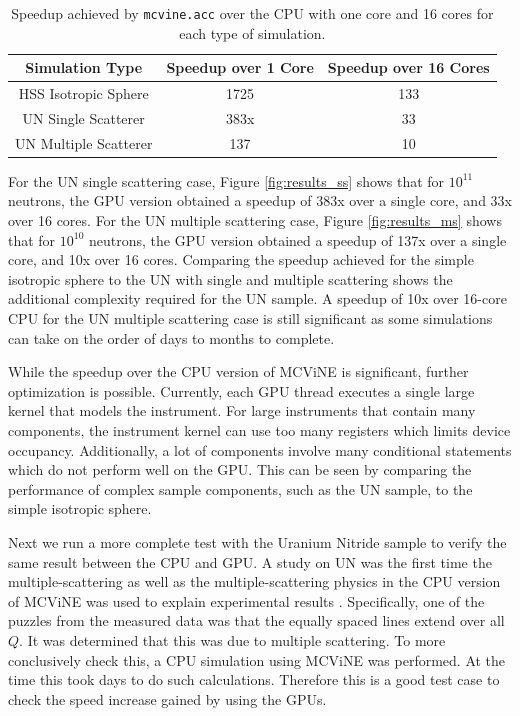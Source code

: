 \begin{table}[h]
    \centering
    \begin{tabular}{c|c|c}
        Simulation Type & Speedup over 1 Core & Speedup over 16 Cores \\
        \hline
        HSS Isotropic Sphere & 1725 & 133 \\
        UN Single Scatterer & 383x & 33 \\
        UN Multiple Scatterer & 137 & 10 \\
        \hline
    \end{tabular}
    \caption{Speedup achieved by \texttt{mcvine.acc} over the CPU with one core and 16 cores for each type of simulation.}
    \label{tab:speedup}
\end{table}


For the UN single scattering case, Figure \ref{fig:results_ss} shows that for $10^{11}$ neutrons, the GPU version obtained a speedup of 383x over a single core, and 33x over 16 cores. For the UN multiple scattering case, Figure \ref{fig:results_ms} shows that for $10^{10}$ neutrons, the GPU version obtained a speedup of 137x over a single core, and 10x over 16 cores. Comparing the speedup achieved for the simple isotropic sphere to the UN with single and multiple scattering shows the additional complexity required for the UN sample. A speedup of 10x over 16-core CPU for the UN multiple scattering case is still significant as some simulations can take on the order of days to months to complete.

While the speedup over the CPU version of MCViNE is significant, further optimization is possible. Currently, each GPU thread executes a single large kernel that models the instrument. For large instruments that contain many components, the instrument kernel can use too many registers which limits device occupancy. Additionally, a lot of components involve many conditional statements which do not perform well on the GPU. This can be seen by comparing the performance of complex sample components, such as the UN sample, to the simple isotropic sphere.

Next we run a more complete test with the Uranium Nitride sample to verify the same result between the CPU and GPU.
A study on UN was the first time the multiple-scattering as well as the multiple-scattering physics in the CPU version of MCViNE was used to explain experimental results \cite{lin2014UN}. Specifically, one of the puzzles from the measured data was that the equally spaced lines extend over all $Q$.  It was determined that this was due to multiple scattering. 
To more conclusively check this, a CPU simulation using MCViNE was performed\cite{lin2014UN}.  At the time this took days to do such calculations.  Therefore this is a good test case to check the speed increase gained by using the GPUs.

